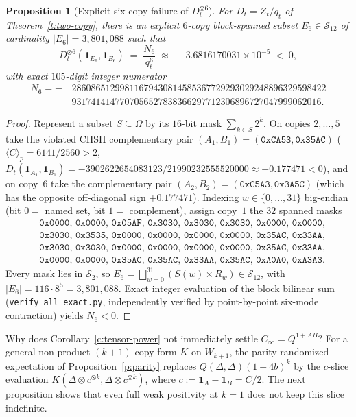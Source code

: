 \documentclass[11pt,a4paper]{article}
\newtheorem{proposition}[theorem]{Proposition}
\theoremstyle{definition}
\theoremstyle{remark}
\newcommand{\ind}[1]{\mathbf{1}_{#1}}
\newcommand{\ev}[1]{\langle #1\rangle_p}
\newcommand{\QAB}{Q^{1+AB}}
\begin{document}
\begin{proposition}[Explicit six-copy failure of $D_t^{\otimes 6}$]\label{p:six-copy}
For $D_t = Z_t / q_t$ of Theorem~\ref{t:two-copy}, there is an explicit $6$-copy block-spanned subset $E_6 \in \mathcal{S}_{12}$ of cardinality $|E_6| = 3{,}801{,}088$ such that
\[
  D_t^{\otimes 6}(\ind{E_6}, \ind{E_6}) \;=\; \frac{N_6}{q_t^6} \;\approx\; -3.6816170031 \times 10^{-5} \;<\; 0,
\]
with exact $105$-digit integer numerator
\begin{align*}
  N_6 = -\,&28608651299811679430814585367729293029248896329598422 \\
           &9317414147707056527838366297712306896727047999062016.
\end{align*}
\end{proposition}

\begin{proof}
Represent a subset $S \subseteq \Omega$ by its $16$-bit mask $\sum_{k \in S} 2^k$. On copies $2,\dots,5$ take the violated CHSH complementary pair $(A_1, B_1) = (\texttt{0xCA53}, \texttt{0x35AC})$ ($\ev{C} = 6141/2560 > 2$, $D_t(\ind{A_1}, \ind{B_1}) = -3902622654083123/21990232555520000 \approx -0.177471 < 0$), and on copy~$6$ take the complementary pair $(A_2, B_2) = (\texttt{0xC5A3}, \texttt{0x3A5C})$ (which has the opposite off-diagonal sign $+0.177471$). Indexing $w \in \{0,\dots,31\}$ big-endian (bit $0 =$ named set, bit $1 =$ complement), assign copy~$1$ the $32$ spanned masks
\begin{align*}
  &\texttt{0x0000, 0x0000, 0x05AF, 0x3030, 0x3030, 0x3030, 0x0000, 0x0000,} \\
  &\texttt{0x3030, 0x3535, 0x0000, 0x0000, 0x0000, 0x0000, 0x35AC, 0x33AA,} \\
  &\texttt{0x3030, 0x3030, 0x0000, 0x0000, 0x0000, 0x0000, 0x35AC, 0x33AA,} \\
  &\texttt{0x0000, 0x0000, 0x35AC, 0x35AC, 0x33AA, 0x35AC, 0xA0A0, 0xA3A3.}
\end{align*}
Every mask lies in $\mathcal{S}_2$, so $E_6 = \bigsqcup_{w=0}^{31} (S(w) \times R_w) \in \mathcal{S}_{12}$, with $|E_6| = 116 \cdot 8^5 = 3{,}801{,}088$. Exact integer evaluation of the block bilinear sum (\texttt{verify\_all\_exact.py}, independently verified by point-by-point six-mode contraction) yields $N_6 < 0$.
\end{proof}

Why does Corollary~\ref{c:tensor-power} not immediately settle $C_\infty = \QAB$? For a general non-product $(k+1)$-copy form $K$ on $W_{k+1}$, the parity-randomized expectation of Proposition~\ref{p:parity} replaces $Q(\Delta,\Delta)(1+4b)^k$ by the $c$-slice evaluation $K(\Delta \otimes c^{\otimes k}, \Delta \otimes c^{\otimes k})$, where $c := \ind A - \ind B = C/2$. The next proposition shows that even full weak positivity at $k = 1$ does not keep this slice indefinite.
\end{document}
